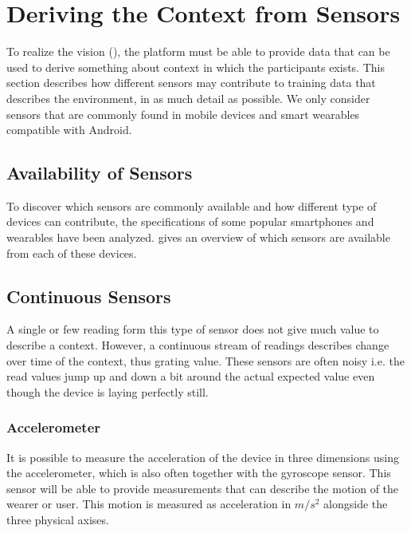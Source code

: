 
\section{Deriving the Context from Sensors}
\label{sec:deriving_the_context_from_sensors}

To realize the vision (), the platform must be able to provide data that can be used to derive something about context in which the participants exists. This section describes how different sensors may contribute to training data that describes the environment, in as much detail as possible. We only consider sensors that are commonly found in mobile devices and smart wearables compatible with Android. 

\subsection{Availability of Sensors}

To discover which sensors are commonly available and how different type of devices can contribute, the specifications of some popular smartphones and wearables have been analyzed.  gives an overview of which sensors are available from each of these devices. 



\subsection{Continuous Sensors}
A single or few reading form this type of sensor does not give much value to describe a context. However, a continuous stream of readings describes change over time of the context, thus grating value. These sensors are often noisy i.e. the read values jump up and down a bit around the actual expected value even though the device is laying perfectly still.

\subsubsection{Accelerometer}
It is possible to measure the acceleration of the device in three dimensions using the accelerometer, which is also often together with the gyroscope sensor. This sensor will be able to provide measurements that can describe the motion of the wearer or user. This motion is measured as acceleration in $m/s^2$ alongside the three physical axises.

